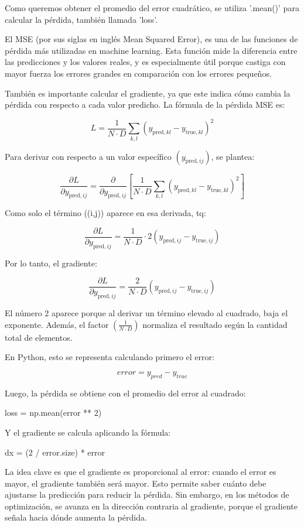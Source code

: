 \documentclass[12pt]{article}
\begin{document}
Como queremos obtener el promedio del error cuadrático, se utiliza '.mean()' para calcular la pérdida, también llamada 'loss'.

El MSE (por sus siglas en inglés Mean Squared Error), es una de las funciones de pérdida más utilizadas en machine learning. 
Esta función mide la diferencia entre las predicciones y los valores reales, y es especialmente útil porque castiga con 
mayor fuerza los errores grandes en comparación con los errores pequeños.

También es importante calcular el gradiente, ya que este indica cómo cambia la pérdida con respecto a cada valor predicho. 
La fórmula de la pérdida MSE es:

$$
L = \frac{1}{N \cdot D} \sum_{k,l} \left( y_{\text{pred},kl} - y_{\text{true},kl} \right)^2
$$

Para derivar con respecto a un valor específico $(y_{\text{pred},ij})$, 
se plantea:

$$
\frac{\partial L}{\partial y_{\text{pred},ij}} =
\frac{\partial}{\partial y_{\text{pred},ij}}
\left[
\frac{1}{N \cdot D}
\sum_{k,l}
\left(
y_{\text{pred},kl} - y_{\text{true},kl}
\right)^2
\right]
$$

Como solo el término ((i,j)) aparece en esa derivada, tq:

$$
\frac{\partial L}{\partial y_{\text{pred},ij}} =
\frac{1}{N \cdot D}
\cdot
2
\left(
y_{\text{pred},ij} - y_{\text{true},ij}
\right)
$$

Por lo tanto, el gradiente:

$$
\frac{\partial L}{\partial y_{\text{pred},ij}} =
\frac{2}{N \cdot D}
\left(
y_{\text{pred},ij} - y_{\text{true},ij}
\right)
$$

El número 2 aparece porque al derivar un término elevado al cuadrado, baja el exponente. Además, 
el factor $(\frac{1}{N \cdot D})$ normaliza el resultado según la cantidad total de elementos.

En Python, esto se representa calculando primero el error:

$$error = y_{pred} - y_{true}$$

Luego, la pérdida se obtiene con el promedio del error al cuadrado:

loss = np.mean(error ** 2)

Y el gradiente se calcula aplicando la fórmula:

dx = (2 / error.size) * error

La idea clave es que el gradiente es proporcional al error: cuando el error es mayor, el gradiente también será mayor. 
Esto permite saber cuánto debe ajustarse la predicción para reducir la pérdida. Sin embargo, en los métodos de optimización, 
se avanza en la dirección contraria al gradiente, porque el gradiente señala hacia dónde aumenta la pérdida.
\end{document}
